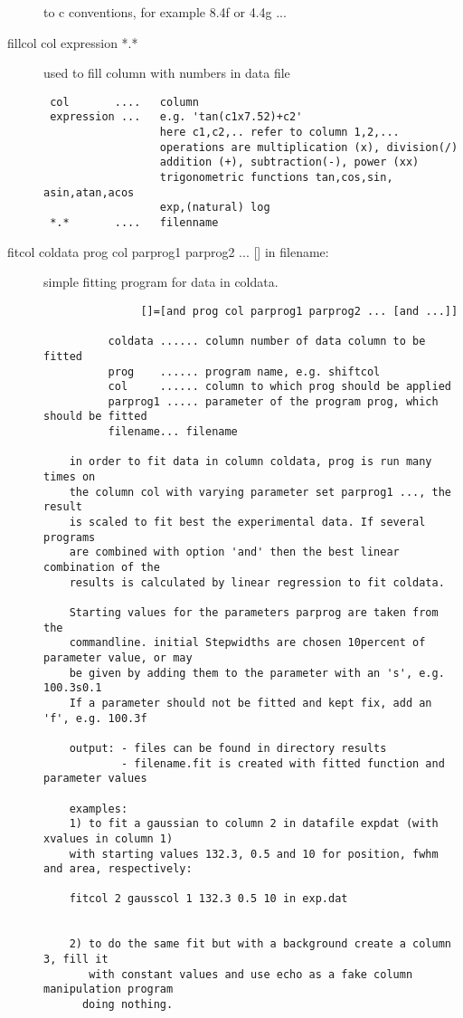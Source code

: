 \begin{description}
             to c conventions, for example 8.4f or 4.4g  ...             
\item [\prg fillcol  col expression *.*\index{fillcol}]  used to fill column with numbers in data file
\begin{verbatim}
 col       ....   column
 expression ...   e.g. 'tan(c1x7.52)+c2'
                  here c1,c2,.. refer to column 1,2,...
                  operations are multiplication (x), division(/)
                  addition (+), subtraction(-), power (xx)
                  trigonometric functions tan,cos,sin, asin,atan,acos
                  exp,(natural) log
 *.*       ....   filenname
\end{verbatim}
\item [\prg fitcol coldata prog col parprog1 parprog2 ... {[]} in filename:]
simple fitting program for data in coldata.
\begin{verbatim}
               []=[and prog col parprog1 parprog2 ... [and ...]]

          coldata ...... column number of data column to be fitted
          prog    ...... program name, e.g. shiftcol
          col     ...... column to which prog should be applied
          parprog1 ..... parameter of the program prog, which should be fitted
          filename... filename

    in order to fit data in column coldata, prog is run many times on
    the column col with varying parameter set parprog1 ..., the result
    is scaled to fit best the experimental data. If several programs
    are combined with option 'and' then the best linear combination of the
    results is calculated by linear regression to fit coldata.

    Starting values for the parameters parprog are taken from the
    commandline. initial Stepwidths are chosen 10percent of parameter value, or may
    be given by adding them to the parameter with an 's', e.g. 100.3s0.1
    If a parameter should not be fitted and kept fix, add an 'f', e.g. 100.3f

    output: - files can be found in directory results
            - filename.fit is created with fitted function and parameter values

    examples:
    1) to fit a gaussian to column 2 in datafile expdat (with xvalues in column 1)
    with starting values 132.3, 0.5 and 10 for position, fwhm and area, respectively:

    fitcol 2 gausscol 1 132.3 0.5 10 in exp.dat


    2) to do the same fit but with a background create a column 3, fill it
       with constant values and use echo as a fake column manipulation program
      doing nothing.


\end{verbatim}
\end{description}
